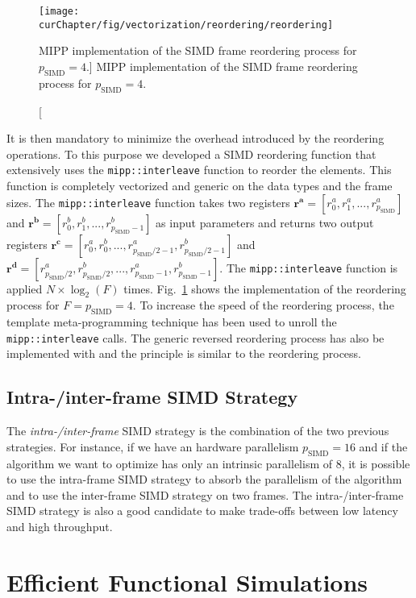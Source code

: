 \begin{figure}[htp]
  \centering
  \texttt{[image: \\curChapter/fig/vectorization/reordering/reordering]}
  \caption
    [MIPP implementation of the SIMD frame reordering process for
     $p_\text{SIMD} = 4$.]
    {MIPP implementation of the SIMD frame reordering process for
     $p_\text{SIMD} = 4$.}
  \label{fig:opt_vec_reordering}
\end{figure}

It is then mandatory to minimize the overhead introduced by the reordering
operations. To this purpose we developed a SIMD reordering function that
extensively uses the \verb|mipp::interleave| function to reorder the elements.
This function is completely vectorized and generic on the data types and the
frame sizes. The \verb|mipp::interleave| function takes two registers $\bm{r^a}
= [r^a_0, r^a_1, ..., r^a_{p_\text{SIMD}}]$ and $\bm{r^b} = [r^b_0, r^b_1,
..., r^b_{p_\text{SIMD}-1}]$ as input parameters and returns two output
registers $\bm{r^c} = [r^a_0, r^b_0, ..., r^a_{p_\text{SIMD}/2-1},
r^b_{p_\text{SIMD}/2-1}]$ and $\bm{r^d} = [r^a_{p_\text{SIMD}/2},
r^b_{p_\text{SIMD}/2}, ..., r^a_{p_\text{SIMD}-1}, r^b_{p_\text{SIMD}-1}]$.
The \verb|mipp::interleave| function is applied $N \times \log_2(F)$ times.
Fig.~\ref{fig:opt_vec_reordering} shows the \MIPP implementation of the
reordering process for $F = p_\text{SIMD} = 4$. To increase the speed of the
reordering process, the template meta-programming technique has been used to
unroll the \verb|mipp::interleave| calls. The generic reversed reordering
process has also be implemented with \MIPP and the principle is similar to the
reordering process.

\subsection{Intra-/inter-frame SIMD Strategy}

The \emph{intra-/inter-frame} SIMD strategy is the combination of the two
previous strategies. For instance, if we have an hardware parallelism
$p_\text{SIMD} = 16$ and if the algorithm we want to optimize has only an
intrinsic parallelism of 8, it is possible to use the intra-frame SIMD strategy
to absorb the parallelism of the algorithm and to use the inter-frame SIMD
strategy on two frames. The intra-/inter-frame SIMD strategy is also a good
candidate to make trade-offs between low latency and high throughput.

\section{Efficient Functional Simulations}
\label{sec:opt_simu}

